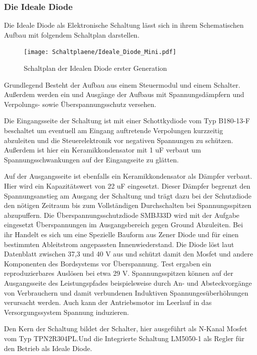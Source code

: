 \subsubsection{Die Ideale Diode}

Die Ideale Diode als Elektronische Schaltung lässt sich in ihrem Schematischen Aufbau mit folgendem Schaltplan darstellen.

\begin{figure}[H]
\centering
\texttt{[image: Schaltplaene/Ideale\_Diode\_Mini.pdf]} 
\caption{Schaltplan der Idealen Diode erster Generation} 
\label{fig:Schaltplan der Idealen Diode erster Generation}
\end{figure}

Grundlegend Besteht der Aufbau aus einem Steuermodul und einem Schalter. Außerdem werden ein und Ausgänge der Aufbaus mit Spannungsdämpfern und Verpolungs- sowie Überspannungsschutz versehen.

Die Eingangsseite der Schaltung ist mit einer Schottkydiode vom Typ B180-13-F beschaltet um eventuell am Eingang auftretende Verpolungen kurzzeitig abzuleiten und die Steuerelektronik vor negativen Spannungen zu schützen. Außerdem ist hier ein Keramikkondensator mit 1 uF verbaut um Spannungsschwankungen auf der Eingangseite zu glätten.

Auf der Ausgangsseite ist ebenfalls ein Keramikkondensator als Dämpfer verbaut. Hier wird ein Kapazitätswert von 22 uF eingesetzt. Dieser Dämpfer begrenzt den Spannungsanstieg am Ausgang der Schaltung und trägt dazu bei der Schutzdiode den nötigen Zeitraum bis zum Vollständigen Durchschalten bei Spannungsspitzen abzupuffern.
Die Überspannungsschutzdiode SMBJ33D wird mit der Aufgabe eingesetzt Überspannungen im Ausgangsbereich gegen Ground Abzuleiten. Bei ihr Handelt es sich um eine Spezielle Bauform aus Zener Diode und für einen bestimmten Ableitstrom angepassten Innenwiederstand. Die Diode löst laut Datenblatt zwischen 37,3 und 40 V aus und schützt damit den Mosfet und andere Komponenten des Bordsystems vor Überspannung. Test ergaben ein reproduzierbares Auslösen bei  etwa 29 V. Spannungsspitzen können auf der Ausgangsseite des Leistungspfades beispielsweise durch An- und Absteckvorgänge von Verbrauchern und damit verbundenen Induktiven Spannungesüberhöhungen verursacht werden. Auch kann der Antriebsmotor im Leerlauf in das Versorgungssystem Spannung induzieren.

Den Kern der Schaltung bildet der Schalter, hier ausgeführt als N-Kanal Mosfet vom Typ TPN2R304PL.Und die Integrierte Schaltung LM5050-1 als Regler für den Betrieb als Ideale Diode.

